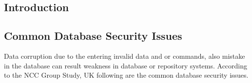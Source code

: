 \documentclass[12pt]{book} %
\begin{document}
\subsection*{Introduction}




\subsection*{Common Database Security Issues}


Data corruption due to the entering invalid data and or commands, also mistake in the database can result weakness in database or repository systems. According to the NCC Group Study, UK following are the common
database security issues.\cite{db_security_an_overview_and_analysis_of_current_trend} \label{sec:db_security_an_overview_and_analysis_of_current_trend_1}\\
\end{document}
